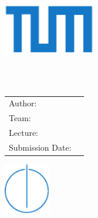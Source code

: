 \begin{titlepage}
  \centering

  \includegraphics[width=40mm]{logos/tum}

  \vspace{5mm}
  {\huge\MakeUppercase{\getFaculty{}}}\\

  \vspace{5mm}
  {\large\MakeUppercase{\getUniversity{}}}\\

  \vspace{20mm}
  {\Large \getDoctype{}}

  \vspace{15mm}
  {\huge\bfseries \getTitle{}}

  \vspace{10mm}
  {\huge\bfseries \getTitleGer{}}

  \vspace{15mm}
  \begin{tabular}{l l}
    Author: & \getAuthor{} \\
    Team: & \getTeam{} \\
    Lecture: & \getLecture{} \\
    Submission Date: & \getSubmissionDate{} \\
  \end{tabular}

  \vspace{20mm}
  \includegraphics[width=20mm]{logos/faculty}
\end{titlepage}
